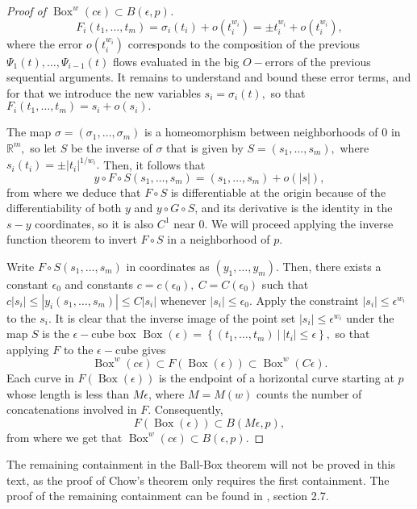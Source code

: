 \documentclass[12pt, letterpaper, reqno]{amsart}
\theoremstyle{definition}
\theoremstyle{plain}
\theoremstyle{remark}
\begin{document}
\begin{proof}[Proof of $\operatorname{Box}^w(c\epsilon)\subset B(\epsilon, p)$]
$$ F_i(t_1,\dots,t_m) = \sigma_i(t_i) + o(t_i^{w_i}) = \pm t_i^{w_i} + o(t_i^{w_i}), $$ 
where the error $ o(t_i^{w_i}) $ corresponds to the composition of the previous $ \Psi_1(t), \dots,\Psi_{i-1}(t) $ flows evaluated in the big $ O- $errors of the previous sequential arguments. It remains to understand and bound these error terms, and for that we introduce the new variables $ s_i=\sigma_i(t), $ so that $ F_i(t_1,\dots,t_m)= s_i + o(s_i). $  

The map $ \sigma=(\sigma_1,\dots,\sigma_m) $ is a homeomorphism between neighborhoods of $ 0 $ in $ \mathbb{R}^m, $ so let $ S $ be the inverse of $ \sigma $ that is given by $ S=(s_1,\dots,s_m), $ where $ s_i(t_i)=\pm |t_i|^{1/w_i}. $ Then, it follows that
$$ y\circ F\circ S (s_1,\dots,s_m) = (s_1,\dots,s_m) + o(|s|), $$ 
from where we deduce that $ F\circ S$ is differentiable at the origin because of the differentiability of both $ y $ and $ y\circ G\circ S $, and its derivative is the identity in the $ s-y $ coordinates, so it is also $ C^1 $ near $ 0. $ We will proceed applying the inverse function theorem to invert $ F\circ S $ in a neighborhood of $ p. $ 

Write $ F\circ S(s_1,\dots,s_m) $ in coordinates as $ (y_1,\dots,y_m).$ Then, there exists a constant $ \epsilon_0 $ and constants $ c=c(\epsilon_0), \ C=C(\epsilon_0) $ such that $ c|s_i| \leq |y_i(s_1,\dots,s_m)|  \leq C|s_i|$ whenever $ |s_i|\leq \epsilon_0. $ Apply the constraint $ |s_i|\leq \epsilon^{w_i} $ to the $ s_i. $ It is clear that the inverse image of the point set $ |s_i|\leq \epsilon^{w_i} $ under the map $ S $ is the $ \epsilon- $cube box $ \operatorname{Box}(\epsilon)= \left\{ (t_1,\dots,t_m)\ | \ |t_i|\leq \epsilon \right\},  $  so that applying $ F $ to the $ \epsilon- $cube gives
$$ \operatorname{Box}^{w}(c\epsilon) \subset F( \operatorname{Box}(\epsilon) ) \subset \operatorname{Box}^w(C\epsilon).   $$ 
Each curve in $ F( \operatorname{Box} (\epsilon) )$ is the endpoint of a horizontal curve starting at $ p $ whose length is less than $ M\epsilon $, where $ M=M(w) $ counts the number of concatenations involved in $ F. $ Consequently,
$$ F( \operatorname{Box} (\epsilon)) \subset B(M\epsilon, p), $$ 
from where we get that $ \operatorname{Box}^w (c\epsilon)\subset B(\epsilon,p). $ 
\end{proof}
The remaining containment in the Ball-Box theorem will not be proved in this text, as the proof of Chow's theorem only requires the first containment. The proof of the remaining containment can be found in \cite{montgomery2002tour}, section 2.7.
\end{document}
